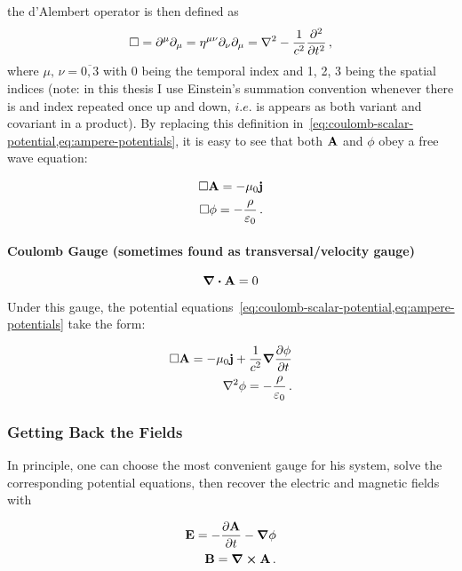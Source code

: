 \documentclass[12pt, class=report, crop=false]{standalone}
\begin{document}
the d'Alembert operator is then defined as
\[
\Box = \partial^{\mu} \partial_{\mu} = \eta^{\mu \nu} \partial_{\nu} \partial_{\mu} = \laplacian{} - \frac{1}{c^{2}} \pdv[2]{}{t} \,,
\]
where \(\mu,\,\nu=\overline{0,3}\) with 0 being the temporal index and 1, 2, 3 being the spatial indices (note: in this thesis I use Einstein's summation convention whenever there is and index repeated once up and down, \(\textit{i}.\textit{e}.\) is appears as both variant and covariant in a product). By replacing this definition in~\cref{eq:coulomb-scalar-potential,eq:ampere-potentials}, it is easy to see that both \(\vb{A}\) and \(\phi\) obey a free wave equation:

\begin{subequations}
  \begin{align}
    \Box \vb{A} = -\mu_0 \vb{j}\\
    \Box \phi = -\frac{\rho}{\varepsilon_0}  \,.
  \end{align}
\end{subequations}

\paragraph{Coulomb Gauge (sometimes found as transversal/velocity gauge)}

\begin{equation}
  \div{\vb{A}} = 0
\end{equation}

\par
Under this gauge, the potential equations~\cref{eq:coulomb-scalar-potential,eq:ampere-potentials} take the form:

\begin{subequations}
  \begin{align}
    \Box \vb{A} = -\mu_0 \vb{j} + \frac{1}{c^{2}} \grad{\pdv{\phi}{t}}\\
    \laplacian{\phi} = -\frac{\rho}{\varepsilon_0}  \,.
  \end{align}
\end{subequations}

\subsubsection{Getting Back the Fields}
In principle, one can choose the most convenient gauge for his system, solve the corresponding potential equations, then recover the electric and magnetic fields with

\begin{subequations}
  \begin{align}
  \vb{E} = -\pdv{\vb{A}}{t} - \grad{\phi} \\
  \vb{B} = \curl{\vb{A}}\,.
  \end{align}
\end{subequations}
\end{document}
